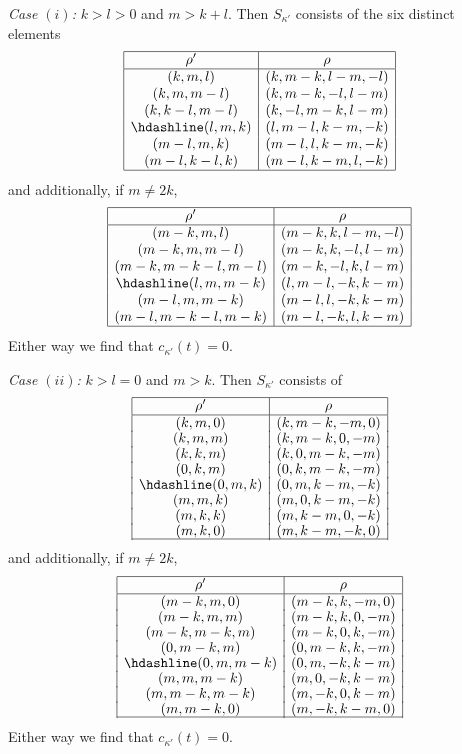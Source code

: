 \documentclass[pdftex]{sigma}
\theoremstyle{definition}
\begin{document}
{\em Case $(i)$:} $k>l>0$ and $m>k+l$.
Then $S_{\kappa'}$ consists of the six distinct elements
\[\begin{array}{|c|c|}
\hline
\rho' & \rho \\ \hline
(k,m,l) & (k,m-k,l-m,-l) \\
(k,m,m-l) & (k,m-k,-l,l-m) \\
(k,k-l,m-l) & (k,-l,m-k,l-m) \\ \hdashline
(l,m,k) & (l,m-l,k-m,-k) \\
(m-l,m,k) & (m-l,l,k-m,-k) \\
(m-l,k-l,k) & (m-l,k-m,l,-k) \\
\hline
\end{array}
\]
and additionally, if $m\ne 2k$,
\[\begin{array}{|c|c|} \hline
\rho' & \rho \\ \hline
(m-k,m,l) & (m-k,k,l-m,-l) \\
(m-k,m,m-l) & (m-k,k,-l,l-m) \\
(m-k,m-k-l,m-l) & (m-k,-l,k,l-m) \\ \hdashline
(l,m,m-k) & (l,m-l,-k,k-m) \\
(m-l,m,m-k) & (m-l,l,-k,k-m) \\
(m-l,m-k-l,m-k) & (m-l,-k,l,k-m) \\
\hline
\end{array}
\]
Either way we find that $c_{\kappa'}(t)=0$.

{\em Case $(ii)$:} $k>l=0$ and $m>k$.
Then $S_{\kappa'}$ consists of
\[\begin{array}{|c|c|}
\hline
\rho' & \rho \\ \hline
(k,m,0) & (k,m-k,-m,0) \\[-1.0pt]
(k,m,m) & (k,m-k,0,-m) \\[-1.0pt]
(k,k,m) & (k,0,m-k,-m) \\[-1.0pt]
(0,k,m) & (0,k,m-k,-m) \\[-1.0pt]
\hdashline
(0,m,k) & (0,m,k-m,-k) \\[-1.0pt]
(m,m,k) & (m,0,k-m,-k) \\[-1.0pt]
(m,k,k) & (m,k-m,0,-k) \\[-1.0pt]
(m,k,0) & (m,k-m,-k,0)\\[-1.0pt]
\hline
\end{array}
\]
and additionally, if $m\ne 2k$,
\[\begin{array}{|c|c|} \hline
\rho' & \rho \\ \hline
(m-k,m,0) & (m-k,k,-m,0) \\[-1.0pt]
(m-k,m,m) & (m-k,k,0,-m) \\[-1.0pt]
(m-k,m-k,m) & (m-k,0,k,-m) \\[-1.0pt]
(0,m-k,m) & (0,m-k,k,-m) \\[-1.0pt] \hdashline
(0,m,m-k) & (0,m,-k,k-m) \\[-1.0pt]
(m,m,m-k) & (m,0,-k,k-m) \\[-1.0pt]
(m,m-k,m-k) & (m,-k,0,k-m) \\[-1.0pt]
(m,m-k,0) & (m,-k,k-m,0) \\[-1.0pt]
\hline
\end{array}
\]
Either way we find that $c_{\kappa'}(t)=0$.
\end{document}
